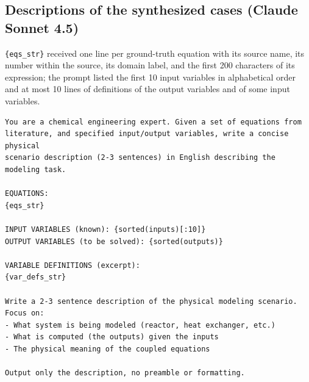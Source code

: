 \subsection*{Descriptions of the synthesized cases (Claude Sonnet 4.5)}
\texttt{\{eqs\_str\}} received one line per ground-truth equation with its source name, its number
within the source, its domain label, and the first 200 characters of its expression; the prompt
listed the first 10 input variables in alphabetical order and at most 10 lines of definitions of
the output variables and of some input variables.
\begin{Verbatim}[fontsize=\scriptsize, breaklines=true, frame=single]
You are a chemical engineering expert. Given a set of equations from
literature, and specified input/output variables, write a concise physical
scenario description (2-3 sentences) in English describing the modeling task.

EQUATIONS:
{eqs_str}

INPUT VARIABLES (known): {sorted(inputs)[:10]}
OUTPUT VARIABLES (to be solved): {sorted(outputs)}

VARIABLE DEFINITIONS (excerpt):
{var_defs_str}

Write a 2-3 sentence description of the physical modeling scenario. Focus on:
- What system is being modeled (reactor, heat exchanger, etc.)
- What is computed (the outputs) given the inputs
- The physical meaning of the coupled equations

Output only the description, no preamble or formatting.
\end{Verbatim}

